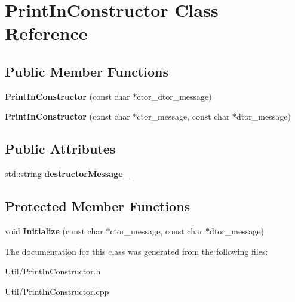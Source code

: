 \hypertarget{class_print_in_constructor}{\section{\-Print\-In\-Constructor \-Class \-Reference}
\label{class_print_in_constructor}
}
\subsection*{\-Public \-Member \-Functions}
\begin{DoxyCompactItemize}
\item 
\hypertarget{class_print_in_constructor_a325bfa0ad054243598783a66efe62929}{{\bfseries \-Print\-In\-Constructor} (const char $\ast$ctor\-\_\-dtor\-\_\-message)}\label{class_print_in_constructor_a325bfa0ad054243598783a66efe62929}

\item 
\hypertarget{class_print_in_constructor_abbb5d38c5df27a4329c32b4855d5314c}{{\bfseries \-Print\-In\-Constructor} (const char $\ast$ctor\-\_\-message, const char $\ast$dtor\-\_\-message)}\label{class_print_in_constructor_abbb5d38c5df27a4329c32b4855d5314c}

\end{DoxyCompactItemize}
\subsection*{\-Public \-Attributes}
\begin{DoxyCompactItemize}
\item 
\hypertarget{class_print_in_constructor_a1309cc9a11057725be496b726de64264}{std\-::string {\bfseries destructor\-Message\-\_\-}}\label{class_print_in_constructor_a1309cc9a11057725be496b726de64264}

\end{DoxyCompactItemize}
\subsection*{\-Protected \-Member \-Functions}
\begin{DoxyCompactItemize}
\item 
\hypertarget{class_print_in_constructor_a92a3e887114ae3ee7cacbb2196f8279e}{void {\bfseries \-Initialize} (const char $\ast$ctor\-\_\-message, const char $\ast$dtor\-\_\-message)}\label{class_print_in_constructor_a92a3e887114ae3ee7cacbb2196f8279e}

\end{DoxyCompactItemize}


\-The documentation for this class was generated from the following files\-:\begin{DoxyCompactItemize}
\item 
\-Util/\-Print\-In\-Constructor.\-h\item 
\-Util/\-Print\-In\-Constructor.\-cpp\end{DoxyCompactItemize}
